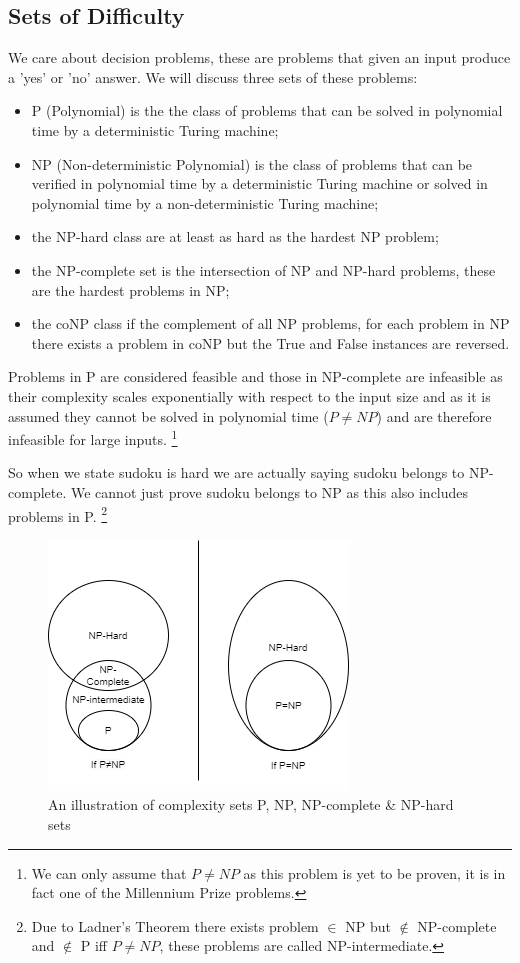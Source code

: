 \documentclass[a4paper,11pt]{report}
\begin{document}
\subsection{Sets of Difficulty} 

We care about decision problems, these are problems that given an input produce a 'yes' or 'no' answer. We will discuss three sets of these problems:
\begin{itemize}
\item{P (Polynomial) is the the class of problems that can be solved in polynomial time by a deterministic Turing machine;}
\item{NP (Non-deterministic Polynomial) is the class of problems that can be verified in polynomial time by a deterministic Turing machine or solved in polynomial time by a non-deterministic Turing machine;}
\item{the NP-hard class are at least as hard as the hardest NP problem;} 
\item{the NP-complete set is the intersection of NP and NP-hard problems, these are the hardest problems in NP;} 
\item{the coNP class if the complement of all NP problems, for each problem in NP there exists a problem in coNP but the True and False instances are reversed.}
\end{itemize}

Problems in P are considered feasible and those in NP-complete are infeasible as their complexity scales exponentially with respect to the input size and as it is assumed they cannot be solved in polynomial time ($P \neq NP$) and are therefore infeasible for large inputs. \footnote{We can only assume that $P\neq NP$ as this problem is yet to be proven, it is in fact one of the Millennium Prize problems.}

So when we state sudoku is hard we are actually saying sudoku belongs to NP-complete. We cannot just prove sudoku belongs to NP as this also includes problems in P. \footnote{Due to Ladner's Theorem there exists problem $\in$ NP but $\not\in$ NP-complete and $\not\in$ P iff $P\neq NP$, these problems are called NP-intermediate.}

\begin{figure}[h!]
	\begin{center}
		\includegraphics{figures/np.drawio.png}
	\end{center}
	\caption{An illustration of complexity sets P, NP, NP-complete \& NP-hard sets}
\end{figure}
\end{document}
